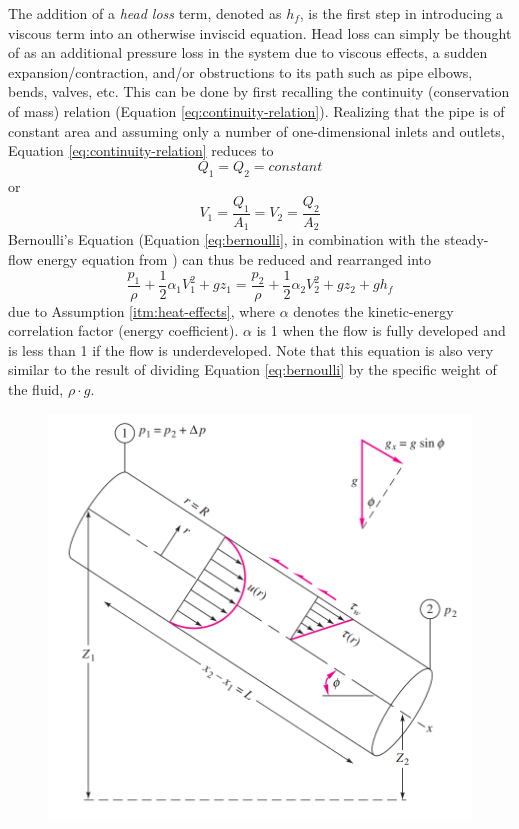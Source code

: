 \documentclass[9pt]{article} %
\numberwithin{equation}{section} %
\begin{document}
\begin{multicols}{2}
The addition of a \textit{head loss} term, denoted as $h_{f}$, is the first step in introducing a viscous term into an otherwise inviscid equation. Head loss can simply be thought of as an additional pressure loss in the system due to viscous effects, a sudden expansion/contraction, and/or obstructions to its path such as pipe elbows, bends, valves, etc. This can be done by first recalling the continuity (conservation of mass) relation (Equation \ref{eq:continuity-relation}). Realizing that the pipe is of constant area and assuming only a number of one-dimensional inlets and outlets, Equation \ref{eq:continuity-relation} reduces to
\begin{equation} \label{eq:equal-q}
Q_{1} = Q_{2} = constant
\end{equation}
or
\begin{equation} \label{eq:equal-v}
V_{1} = \frac{Q_{1}}{A_{1}} = V_{2} = \frac{Q_{2}}{A_{2}}
\end{equation}
Bernoulli's Equation (Equation \ref{eq:bernoulli}, in combination with the steady-flow energy equation from \cite{fluid-mechanics}) can thus be reduced and rearranged into
\begin{equation} \label{eq:steady-flow-energy}
\frac{p_{1}}{\rho} + \frac{1}{2} \alpha_{1} V^{2}_{1} + gz_{1} = \frac{p_{2}}{\rho} + \frac{1}{2} \alpha_{2} V^{2}_{2} + gz_{2} + gh_{f}
\end{equation}
due to Assumption \ref{itm:heat-effects}, where $\alpha$ denotes the kinetic-energy correlation factor (energy coefficient). $\alpha$ is 1 when the flow is fully developed and is less than 1 if the flow is underdeveloped. Note that this equation is also very similar to the result of dividing Equation \ref{eq:bernoulli} by the specific weight of the fluid, $\rho \cdot g$.
\begin{figure}[h]
\centering
\includegraphics[scale=0.45]{inclined_pipe}

\end{figure}
\end{multicols}
\end{document}
